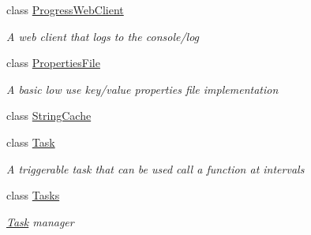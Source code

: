 \begin{DoxyCompactItemize}
class \hyperlink{classOTA_1_1Misc_1_1ProgressWebClient}{Progress\+Web\+Client}
\begin{DoxyCompactList}\small\item\em A web client that logs to the console/log \end{DoxyCompactList}\item 
class \hyperlink{classOTA_1_1Misc_1_1PropertiesFile}{Properties\+File}
\begin{DoxyCompactList}\small\item\em A basic low use key/value properties file implementation \end{DoxyCompactList}\item 
class \hyperlink{classOTA_1_1Misc_1_1StringCache}{String\+Cache}
\item 
class \hyperlink{classOTA_1_1Misc_1_1Task}{Task}
\begin{DoxyCompactList}\small\item\em A triggerable task that can be used call a function at intervals \end{DoxyCompactList}\item 
class \hyperlink{classOTA_1_1Misc_1_1Tasks}{Tasks}
\begin{DoxyCompactList}\small\item\em \hyperlink{classOTA_1_1Misc_1_1Task}{Task} manager \end{DoxyCompactList}\end{DoxyCompactItemize}
